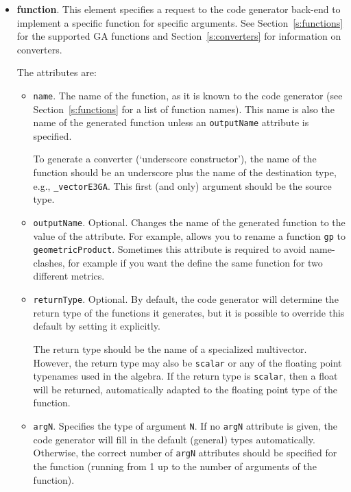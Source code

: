 \documentclass[10pt, a4paper]{article}
\begin{document}
\begin{itemize}
\item {\bf function}. This element specifies a request to the code generator back-end to implement a specific function
       for specific arguments. See Section~\ref{s:functions} for the supported GA functions and Section~\ref{s:converters} for
       information on converters.
       
       The attributes are:
       \begin{itemize}
       \item {\tt name}. The name of the function, as it is known to the code generator (see Section~\ref{s:functions} for a list of function names).
       	     This name is also the name of the generated function unless an {\tt outputName} attribute is specified. 
       	     
       	     To generate a converter (`underscore constructor'), the name of the function should be an underscore plus the name of the destination type, 
       	     e.g., {\tt \_vectorE3GA}. This first (and only) argument should be the source type.
             
       \item {\tt outputName}. Optional. Changes the name of the generated function to the value of the attribute. For example, allows you
            to rename a function {\tt gp} to {\tt geometricProduct}. Sometimes this attribute is required to avoid name-clashes, for example
            if you want the define the same function for two different metrics.
            
       \item {\tt returnType}. Optional. By default, the code generator will determine the return type of the functions it generates, 
       		but it is possible to override this default by setting it explicitly. 
       		
            The return type should be the name of a specialized multivector. However, the return type may also be {\tt scalar} or any of the 
            floating point typenames used in the algebra.
            If the return type is {\tt scalar}, then a float will be returned, automatically adapted to the floating point type of the function.
            
       \item {\tt argN}. Specifies the type of argument {\tt N}. If no {\tt argN} attribute is given, the code generator will fill in the 
       	     default (general) types automatically. Otherwise, the correct number of {\tt argN} attributes should be specified for the function 
       	     (running from 1 up to the number of arguments of the function). 
       	     

\end{itemize}
\end{itemize}
\end{document}
